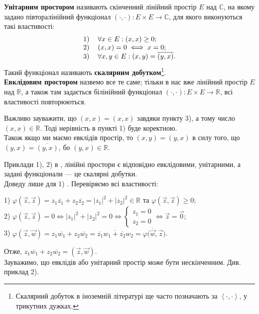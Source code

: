 \documentclass{math_library}
\begin{document}
\begin{definition}
\textbf{Унітарним простором} називають скінченний лінійний простір $E$ над $\mathbb{C}$, на якому задано півторалінійний функціонал $(\cdot, \cdot) \colon E \times E \to \mathbb{C}$, для якого виконуються такі властивості:
\begin{align*}
\begin{tabular}{cl}
1) & $\forall x \in E: (x, x) \geq 0;$\\
2) & $(x, x) = 0 \iff x = 0;$\\
3) & $\forall x,y \in E: (x, y) = \overline{(y, x)}.$
\end{tabular}
\end{align*}
Такий функціонал називають \textbf{скалярним добутком}\footnote{Скалярний добуток в іноземній літературі ще часто позначають за $\left< \cdot, \cdot \right>$, у трикутних дужках.}.
\bigskip \\
\textbf{Евклідовим простором} назвемо все те саме; тільки в нас вже лінійний простір $E$ над $\mathbb{R}$, а також там задається білінійний функціонал $(\cdot, \cdot) \colon E \times E \to \mathbb{R}$, всі властивості повторюються.
\end{definition}

\begin{remark}
Важливо зауважити, що $(x,x) = \overline{(x,x)}$ завдяки пункту 3), а тому число $(x,x) \in \mathbb{R}$. Тоді нерівність в пункті 1) буде коректною.\\
Також якщо ми маємо евклідів простір, то $(x,y) = (y,x)$ в силу того, що $(y,x) = \overline{(y,x)}$, бо $(y,x) \in \mathbb{R}$.
\end{remark}

\begin{example}
Приклади 1), 2) в ,  лінійні простори є відповідно евклідовими, унітарними, а задані функціонали --- це скалярні добутки.\\
Доведу лише для 1) . Перевіряємо всі властивості:
\begin{center}
1) $\varphi(\vec{z},\vec{z}) = z_1 \overline{z_1} + z_2 \overline{z_2} = |z_1|^2 + |z_2|^2 \in \mathbb{R}$ та $\varphi(\vec{z},\vec{z}) \geq 0$;\\
2) $\varphi(\vec{z},\vec{z}) = 0 \iff |z_1|^2 + |z_2|^2 = 0 \iff \begin{cases} z_1 = 0 \\ z_2 = 0 \end{cases} \iff \vec{z} = \vec{0}$;\\
3) $\varphi(\vec{z},\vec{w}) = z_1 \overline{w_1} + z_2 \overline{w_2} = \overline{\overline{z_1} w_1 + \overline{z_2} w_2} = \overline{\varphi(\vec{w},\vec{z}})$.
\end{center}
Отже, $z_1 \overline{w_1} + z_2 \overline{w_2} = (\vec{z},\vec{w})$.
\bigskip \\
Зауважимо, що евклідів або унітарний простір може бути нескінченним. Див. приклад 2).
\end{example}
\end{document}
